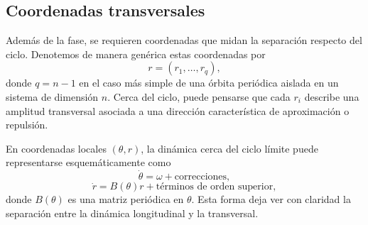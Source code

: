 \subsection{Coordenadas transversales}

Además de la fase, se requieren coordenadas que midan la separación respecto del ciclo. Denotemos de manera genérica estas coordenadas por
\begin{equation}
r=(r_1,\dots,r_q),
\label{eq:Koopman_tube_transverse_coords}
\end{equation}
donde \(q=n-1\) en el caso más simple de una órbita periódica aislada en un sistema de dimensión \(n\). Cerca del ciclo, puede pensarse que cada \(r_i\) describe una amplitud transversal asociada a una dirección característica de aproximación o repulsión.

En coordenadas locales \((\theta,r)\), la dinámica cerca del ciclo límite puede representarse esquemáticamente como
\begin{equation}
\dot{\theta}=\omega+\text{correcciones},
\label{eq:Koopman_tube_theta_dynamics}
\end{equation}
\begin{equation}
\dot{r}=B(\theta)r+\text{términos de orden superior},
\label{eq:Koopman_tube_r_dynamics}
\end{equation}
donde \(B(\theta)\) es una matriz periódica en \(\theta\). Esta forma deja ver con claridad la separación entre la dinámica longitudinal y la transversal.

